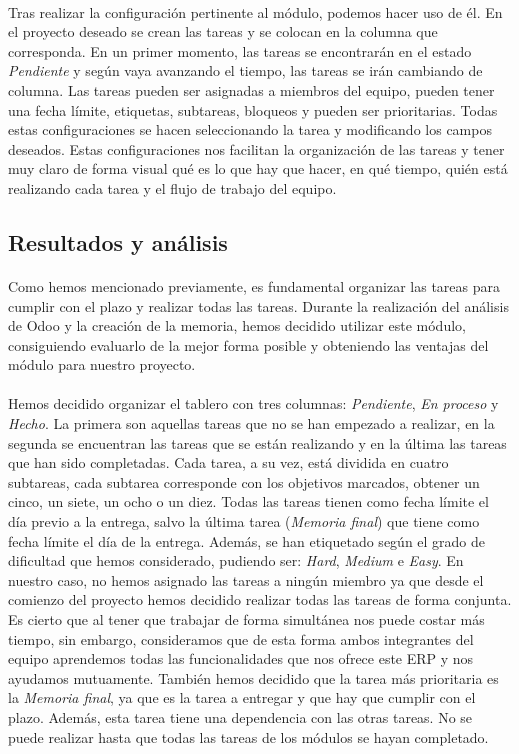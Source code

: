 \paragraph{}
Tras realizar la configuración pertinente al módulo, podemos hacer uso de él. En el proyecto deseado se crean las tareas y se colocan en la columna que corresponda. En un primer momento, las tareas se encontrarán en el estado \textit{Pendiente} y según vaya avanzando el tiempo, las tareas se irán cambiando de columna. Las tareas pueden ser asignadas a miembros del equipo, pueden tener una fecha límite, etiquetas, subtareas, bloqueos y pueden ser prioritarias. Todas estas configuraciones se hacen seleccionando la tarea y modificando los campos deseados. Estas configuraciones nos facilitan la organización de las tareas y tener muy claro de forma visual qué es lo que hay que hacer, en qué tiempo, quién está realizando cada tarea y el flujo de trabajo del equipo.

\subsection{Resultados y análisis}
\paragraph{}
Como hemos mencionado previamente, es fundamental organizar las tareas para cumplir con el plazo y realizar todas las tareas. Durante la realización del análisis de Odoo y la creación de la memoria, hemos decidido utilizar este módulo, consiguiendo evaluarlo de la mejor forma posible y obteniendo las ventajas del módulo para nuestro proyecto.
\paragraph{}
Hemos decidido organizar el tablero con tres columnas: \textit{Pendiente}, \textit{En proceso} y \textit{Hecho}. La primera son aquellas tareas que no se han empezado a realizar, en la segunda se encuentran las tareas que se están realizando y en la última las tareas que han sido completadas. Cada tarea, a su vez, está dividida en cuatro subtareas, cada subtarea corresponde con los objetivos marcados, obtener un cinco, un siete, un ocho o un diez. Todas las tareas tienen como fecha límite el día previo a la entrega, salvo la última tarea (\textit{Memoria final}) que tiene como fecha límite el día de la entrega. Además, se han etiquetado según el grado de dificultad que hemos considerado, pudiendo ser: \textit{Hard}, \textit{Medium} e \textit{Easy}. En nuestro caso, no hemos asignado las tareas a ningún miembro ya que desde el comienzo del proyecto hemos decidido realizar todas las tareas de forma conjunta. Es cierto que al tener que trabajar de forma simultánea nos puede costar más tiempo, sin embargo, consideramos que de esta forma ambos integrantes del equipo aprendemos todas las funcionalidades que nos ofrece este ERP y nos ayudamos mutuamente. También hemos decidido que la tarea más prioritaria es la \textit{Memoria final}, ya que es la tarea a entregar y que hay que cumplir con el plazo. Además, esta tarea tiene una dependencia con las otras tareas. No se puede realizar hasta que todas las tareas de los módulos se hayan completado.

